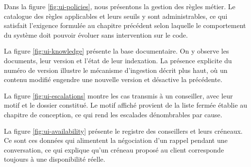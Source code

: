 
Dans la figure \ref{fig:ui-policies}, nous présentons la gestion des règles métier. Le catalogue des règles applicables et leurs seuils y sont administrables, ce qui satisfait l'exigence formulée au chapitre précédent selon laquelle le comportement du système doit pouvoir évoluer sans intervention sur le code.


La figure \ref{fig:ui-knowledge} présente la base documentaire. On y observe les documents, leur version et l'état de leur indexation. La présence explicite du numéro de version illustre le mécanisme d'ingestion décrit plus haut, où un contenu modifié engendre une nouvelle version et désactive la précédente.


La figure \ref{fig:ui-escalations} montre les cas transmis à un conseiller, avec leur motif et le dossier constitué. Le motif affiché provient de la liste fermée établie au chapitre de conception, ce qui rend les escalades dénombrables par cause.


La figure \ref{fig:ui-availability} présente le registre des conseillers et leurs créneaux. Ce sont ces données qui alimentent la négociation d'un rappel pendant une conversation, ce qui explique qu'un créneau proposé au client corresponde toujours à une disponibilité réelle.


